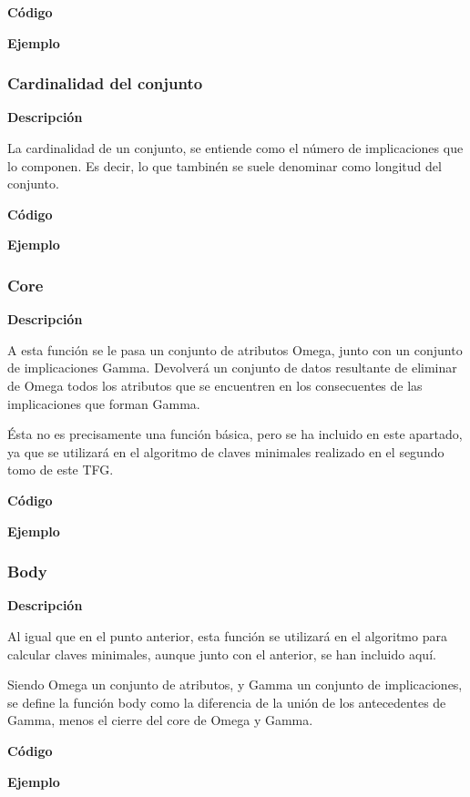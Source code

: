     \textbf{C\'odigo}


    \textbf{Ejemplo}



\subsubsection{Cardinalidad del conjunto}

    \textbf{Descripci\'on}

    La cardinalidad de un conjunto, se entiende como el n\'umero de implicaciones que lo componen. Es decir, lo que 
    tambin\'en se suele denominar como longitud del conjunto.


    \textbf{C\'odigo}


    \textbf{Ejemplo}




\subsubsection{Core}

    \textbf{Descripci\'on}

    A esta funci\'on se le pasa un conjunto de atributos Omega, junto con un conjunto de implicaciones Gamma. 
    Devolver\'a un conjunto de datos resultante de eliminar de Omega todos los atributos que se encuentren en los 
    consecuentes de las implicaciones que forman Gamma. 
    
    \'Esta no es precisamente una funci\'on b\'asica, pero se ha incluido en este apartado, ya que se utilizar\'a 
    en el algoritmo de claves minimales realizado en el segundo tomo de este TFG.




    \textbf{C\'odigo}


    \textbf{Ejemplo}




\subsubsection{Body}

    \textbf{Descripci\'on}

    Al igual que en el punto anterior, esta funci\'on se utilizar\'a en el algoritmo para calcular claves minimales, aunque junto con 
    el anterior, se han incluido aqu\'i.

    Siendo Omega un conjunto de atributos, y Gamma un conjunto de implicaciones, se define la funci\'on body como la diferencia 
    de la uni\'on de los antecedentes de Gamma, menos el cierre del core de Omega y Gamma. 

    \textbf{C\'odigo}


    \textbf{Ejemplo}


